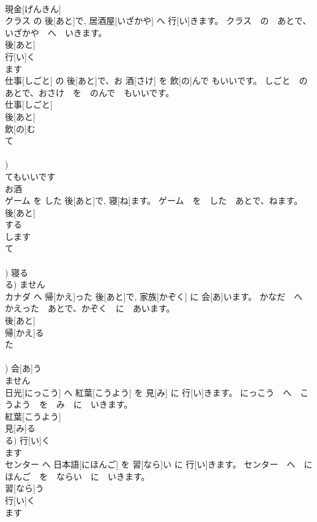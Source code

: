 \documentclass[8pt]{extreport}
\begin{document}
\begin{CJK}{UTF8}{min}
\\	現金[げんきん] 
\\	クラス の 後[あと]で, 居酒屋[いざかや] へ 行[い]きます。	クラス　の　あとで、いざかや　へ　いきます。	
\\	後[あと] 
\\	行[い]く 
\\	ます 
\\	仕事[しごと] の 後[あと]で、お 酒[さけ] を 飲[の]んで もいいです。	しごと　の　あとで、おさけ　を　のんで　もいいです。	
\\	仕事[しごと] 
\\	後[あと] 
\\	飲[の]む 
\\	て 
\\	[む/ぶ/ぬ] 
\\	[んで])	
\\	てもいいです 
\\	お酒 
\\	ゲーム を した 後[あと]で, 寝[ね]ます。	ゲーム　を　した　あとで、ねます。	
\\	後[あと] 
\\	する 
\\	します 
\\	て 
\\	[する] 
\\	[して])	寝る 
\\	る)	ません 
\\	カナダ へ 帰[かえ]った 後[あと]で, 家族[かぞく] に 会[あ]います。	かなだ　へ　かえった　あとで、かぞく　に　あいます。	
\\	後[あと] 
\\	帰[かえ]る 
\\	た 
\\	[る/つ/う] 
\\	[った])	会[あ]う 
\\	ません 
\\	日光[にっこう] へ 紅葉[こうよう] を 見[み] に 行[い]きます。	にっこう　へ　こうよう　を　み　に　いきます。	
\\	紅葉[こうよう] 
\\	見[み]る 
\\	る)	行[い]く 
\\	ます 
\\	センター へ 日本語[にほんご] を 習[なら]い に 行[い]きます。	センター　へ　にほんご　を　ならい　に　いきます。	
\\	習[なら]う 
\\	行[い]く 
\\	ます 
\end{CJK}
\end{document}
